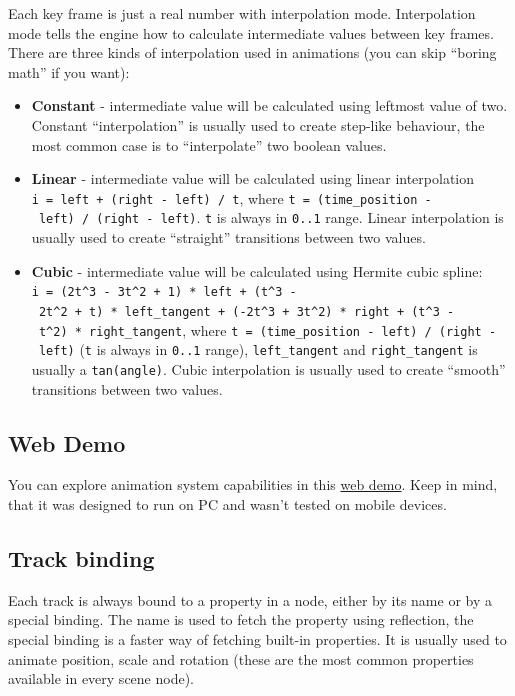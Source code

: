 \documentclass[
]{book}
\providecommand{\tightlist}{%
  \setlength{\itemsep}{0pt}\setlength{\parskip}{0pt}}
\theoremstyle{definition}
\theoremstyle{definition}
\theoremstyle{definition}
\theoremstyle{definition}
\theoremstyle{remark}
\begin{document}
Each key frame is just a real number with interpolation mode. Interpolation mode tells the engine how to calculate intermediate values between key frames. There are three kinds of interpolation used in animations (you can skip ``boring math'' if you want):

\begin{itemize}
\tightlist
\item
  \textbf{Constant} - intermediate value will be calculated using leftmost value of two. Constant ``interpolation'' is usually used to create step-like behaviour, the most common case is to ``interpolate'' two boolean values.
\item
  \textbf{Linear} - intermediate value will be calculated using linear interpolation \texttt{i\ =\ left\ +\ (right\ -\ left)\ /\ t}, where \texttt{t\ =\ (time\_position\ -\ left)\ /\ (right\ -\ left)}. \texttt{t} is always in \texttt{0..1} range. Linear interpolation is usually used to create ``straight'' transitions between two values.
\item
  \textbf{Cubic} - intermediate value will be calculated using Hermite cubic spline: \texttt{i\ =\ (2t\^{}3\ -\ 3t\^{}2\ +\ 1)\ *\ left\ +\ (t\^{}3\ -\ 2t\^{}2\ +\ t)\ *\ left\_tangent\ +\ (-2t\^{}3\ +\ 3t\^{}2)\ *\ right\ +\ (t\^{}3\ -\ t\^{}2)\ *\ right\_tangent}, where \texttt{t\ =\ (time\_position\ -\ left)\ /\ (right\ -\ left)} (\texttt{t} is always in \texttt{0..1} range), \texttt{left\_tangent} and \texttt{right\_tangent} is usually a \texttt{tan(angle)}. Cubic interpolation is usually used to create ``smooth'' transitions between two values.
\end{itemize}

\subsection{Web Demo}\label{web-demo}

You can explore animation system capabilities in this \href{https://fyrox.rs/assets/demo/animation/index.html}{web demo}. Keep in mind, that it was designed to run on PC and wasn't tested on mobile devices.

\subsection{Track binding}\label{track-binding}

Each track is always bound to a property in a node, either by its name or by a special binding. The name is used to fetch the property using reflection, the special binding is a faster way of fetching built-in properties. It is usually used to animate position, scale and rotation (these are the most common properties available in every scene node).
\end{document}

